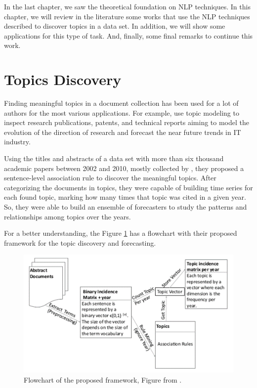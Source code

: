 In the last chapter, we saw the theoretical foundation on NLP techniques. In this chapter, we will review in the literature some works that use the NLP techniques described to discover topics in a data set. In addition, we will show some applications for this type of task. And, finally, some final remarks to continue this work.


\section{Topics Discovery}

Finding meaningful topics in a document collection has been used for a lot of authors for the most various applications. For example,  use topic modeling to inspect research publications, patents, and technical reports aiming to model the evolution of the direction of research and forecast the near future trends in IT industry.

Using the titles and abstracts of a data set with more than six thousand academic papers between 2002 and 2010, mostly collected by , they proposed a sentence-level association rule to discover the meaningful topics. After categorizing the documents in topics, they were capable of building time series for each found topic, marking how many times that topic was cited in a given year. So, they were able to build an ensemble of forecasters to study the patterns and relationships among topics over the years.

For a better understanding, the Figure \ref{fig:topic-discovery-framework} has a flowchart with their proposed framework for the topic discovery and forecasting.

\begin{figure}[h!]
	\centering
	\includegraphics[width=0.6\linewidth]{01.Chapters/03.RelatedWorks/topic-discovery-framework}
	\caption{Flowchart of the proposed framework, Figure from  \cite{hurtado2016topic}.}
	\label{fig:topic-discovery-framework}
\end{figure}

